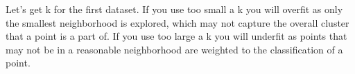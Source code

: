 \documentclass{homework}
\begin{document}
\question

\question
\begin{alphaparts}
    \questionpart Let's get k for the first dataset.
    \questionpart If you use too small a k you will overfit as only the smallest neighborhood is explored, which may not capture the overall cluster that a point is a part of. If you use too large a k you will underfit as points that may not be in a reasonable neighborhood are weighted to the classification of a point.
\end{alphaparts}
\end{document}
